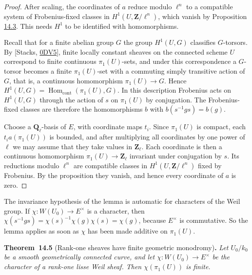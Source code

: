 \documentclass[11pt]{article}
\newenvironment{bpstatement}[2]{\par\addvspace{0.6\baselineskip}\noindent\textbf{#1}#2\textbf{.}\enspace\ignorespaces}
  {\par\addvspace{0.4\baselineskip}}
\newenvironment{bpstatementit}[2]{\begin{bpstatement}{#1}{#2}\itshape\ignorespaces}{\end{bpstatement}}
\providecommand{\Hom}{}\renewcommand{\Hom}{\operatorname{Hom}}
\begin{document}
\begin{proof}[{Proof}]\label{bp18}%
After scaling, the coordinates of \(a\) reduce modulo \(\ell^n\) to a compatible system of Frobenius-fixed classes in \(H^1(U,\mathbf Z/\ell^n)\), which vanish by Proposition \hyperref[bp13]{14.3}. This needs \(H^1\) to be identified with homomorphisms.

Recall that for a finite abelian group \(G\) the group \(H^1(U,G)\) classifies \(G\)-torsors. By [Stacks, \href{https://stacks.math.columbia.edu/tag/0DV5}{0DV5}], finite locally constant sheaves on the connected scheme \(U\) correspond to finite continuous \(\pi_1(U)\)-sets, and under this correspondence a \(G\)-torsor becomes a finite \(\pi_1(U)\)-set with a commuting simply transitive action of \(G\), that is, a continuous homomorphism \(\pi_1(U)\to G\). Hence \(H^1(U,G)=\Hom_{\mathrm{cont}}(\pi_1(U),G)\). In this description Frobenius acts on \(H^1(U,G)\) through the action of \(s\) on \(\pi_1(U)\) by conjugation. The Frobenius-fixed classes are therefore the homomorphisms \(b\) with \(b(s^{-1}gs)=b(g)\).

Choose a \(\mathbf Q_\ell\)-basis of \(E\), with coordinate maps \(t_i\).  Since \(\pi_1(U)\) is compact, each \(t_i a(\pi_1(U))\) is bounded, and after multiplying all coordinates by one power of \(\ell\) we may assume that they take values in \(\mathbf Z_\ell\).  Each coordinate is then a continuous homomorphism \(\pi_1(U)\to\mathbf Z_\ell\) invariant under conjugation by \(s\). Its reductions modulo \(\ell^n\) are compatible classes in \(H^1(U,\mathbf Z/\ell^n)\) fixed by Frobenius. By the proposition they vanish, and hence every coordinate of \(a\) is zero.
\end{proof}

\label{bp19}%
The invariance hypothesis of the lemma is automatic for characters of the Weil group. If \(\chi:W(U_0)\to E^\times\) is a character, then \(\chi(s^{-1}gs)=\chi(s)^{-1}\chi(g)\chi(s)=\chi(g)\), because \(E^\times\) is commutative. So the lemma applies as soon as \(\chi\) has been made additive on \(\pi_1(U)\).

\label{bp20}%
\begin{bpstatementit}{Theorem~14.5}{ (Rank-one sheaves have finite geometric monodromy)}
Let \(U_0/k_0\) be a smooth geometrically connected curve, and let \(\chi:W(U_0)\to E^\times\) be the character of a rank-one lisse Weil sheaf.  Then \(\chi(\pi_1(U))\) is finite.
\end{bpstatementit}
\end{document}
